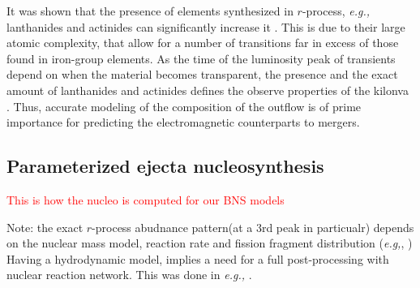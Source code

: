 \documentclass[11pt,a4paper,headinclude=true,DIV=14,BCOR=8mm,chapterprefix,listof=totoc,twoside,openright,abstracton]{scrbook}
\newcommand{\red}[1]{\textcolor{red}{#1}}
\begin{document}

%
It was shown that the presence of elements synthesized in $r$-process, \textit{e.g.,} lanthanides and actinides can significantly increase it \cite{Kasen:2013xka,Tanaka:2013ana}. 
This is due to their large atomic complexity, that allow for a number of transitions far in excess of those found in iron-group elements. 
As the time of the luminosity peak of transients depend on when the material becomes transparent, the presence and the exact amount of lanthanides and actinides defines the observe properties of the kilonva \cite{Barnes:2013wka,Tanaka:2013ana}. 
%
Thus, accurate modeling of the composition of the outflow is of prime importance for predicting the electromagnetic counterparts to mergers. 


\subsection{Parameterized ejecta nucleosynthesis}
\red{This is how the nucleo is computed for our BNS models}

Note: the exact $r$-process abudnance pattern(at a 3rd peak in particualr) depends on the nuclear mass model, reaction rate and fission fragment distribution 
(\textit{e.g,}, \cite{Goriely et al., 2005; Arcones and Martinez-Pinedo, 2011; Mumpower et al., 2012; Mendoza-Temis et al., 2015; Eichler et al., 2015})
Having a hydrodynamic model, implies a need for a full post-processing with nuclear reaction network. This was done in \textit{e.g.,} 
\cite{Goriely et al. (2011), Korobkin et al. (2012), Grossman et al. (2014),Wanajo et al. (2014), Just et al. (2015), and Martin et al. (2015)}.
\end{document}
